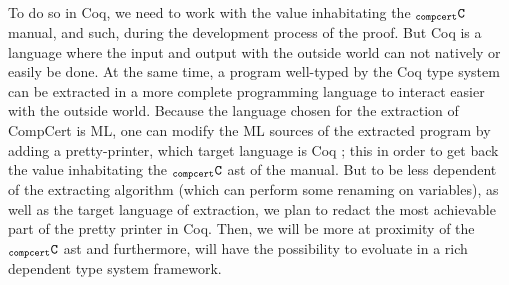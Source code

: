 \documentclass[a4paper, 11pt]{article}
\newcommand{\C}{$_{\tt compcert}{\tt C}$\xspace}
\begin{document}
To do so in Coq, we need to work with the value inhabitating the \C manual, and such, during the development process of the proof. But Coq is a language where the input and output with the outside world can not natively or easily be done. At the same time, a program well-typed by the Coq type system can be extracted in a more complete programming language to interact easier with the outside world. Because the language chosen for the extraction of CompCert is ML, one can modify the ML sources of the extracted program by adding a pretty-printer, which target language is Coq ; this in order to get back the value inhabitating the \C ast of the manual. But to be less dependent of the extracting algorithm (which can perform some renaming on variables), as well as the target language of extraction, we plan to redact the most achievable part of the pretty printer in Coq. Then, we will be more at proximity of the \C ast and furthermore, will have the possibility to evoluate in a rich dependent type system framework. 
\end{document}
